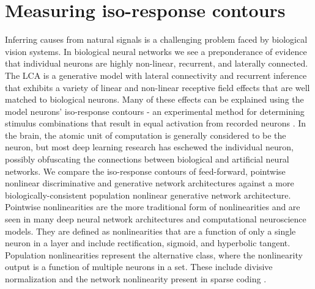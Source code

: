 \section{Measuring iso-response contours}\label{sec:ch4_iso_contours}
Inferring causes from natural signals is a challenging problem faced by biological vision systems.
In biological neural networks we see a preponderance of evidence that individual neurons are highly non-linear, recurrent, and laterally connected.
The LCA is a generative model with lateral connectivity and recurrent inference that exhibits a variety of linear \parencite{olshausen1996emergence} and non-linear \parencite{zhu2013visual} receptive field effects that are well matched to biological neurons.
Many of these effects can be explained using the model neurons' iso-response contours - an experimental method for determining stimulus combinations that result in equal activation from recorded neurons \parencite{golden2016conjectures}.
In the brain, the atomic unit of computation is generally considered to be the neuron, but most deep learning research has eschewed the individual neuron, possibly obfuscating the connections between biological and artificial neural networks.
We compare the iso-response contours of feed-forward, pointwise nonlinear discriminative and generative network architectures against a more biologically-consistent population nonlinear generative network architecture.
Pointwise nonlinearities are the more traditional form of nonlinearities and are seen in many deep neural network architectures and computational neuroscience models.
They are defined as nonlinearities that are a function of only a single neuron in a layer and include rectification, sigmoid, and hyperbolic tangent.
Population nonlinearities represent the alternative class, where the nonlinearity output is a function of multiple neurons in a set.
These include divisive normalization \parencite{carandini2012normalization, balle2016end} and the network nonlinearity present in sparse coding \parencite{rozell2008sparse, olshausen1997sparse}.


